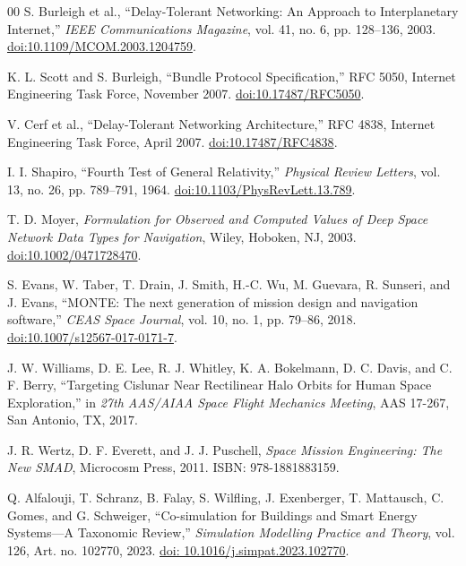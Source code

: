 \documentclass[a4paper,fleqn]{cas-sc}
\begin{document}
\begin{thebibliography}{00}
 S. Burleigh et al., ``Delay-Tolerant Networking: An Approach to Interplanetary Internet,'' \textit{IEEE Communications Magazine}, vol. 41, no. 6, pp. 128--136, 2003. \href{https://doi.org/10.1109/MCOM.2003.1204759}{doi:10.1109/MCOM.2003.1204759}.

 K. L. Scott and S. Burleigh, ``Bundle Protocol Specification,'' RFC 5050, Internet Engineering Task Force, November 2007. \href{https://doi.org/10.17487/RFC5050}{doi:10.17487/RFC5050}.

 V. Cerf et al., ``Delay-Tolerant Networking Architecture,'' RFC 4838, Internet Engineering Task Force, April 2007. \href{https://doi.org/10.17487/RFC4838}{doi:10.17487/RFC4838}.

 I. I. Shapiro, ``Fourth Test of General Relativity,'' \textit{Physical Review Letters}, vol. 13, no. 26, pp. 789--791, 1964. \href{https://doi.org/10.1103/PhysRevLett.13.789}{doi:10.1103/PhysRevLett.13.789}.

 T. D. Moyer, \textit{Formulation for Observed and Computed Values of Deep Space Network Data Types for Navigation}, Wiley, Hoboken, NJ, 2003. \href{https://doi.org/10.1002/0471728470}{doi:10.1002/0471728470}.

 S. Evans, W. Taber, T. Drain, J. Smith, H.-C. Wu, M. Guevara, R. Sunseri, and J. Evans, ``MONTE: The next generation of mission design and navigation software,'' \textit{CEAS Space Journal}, vol. 10, no. 1, pp. 79--86, 2018. \href{https://doi.org/10.1007/s12567-017-0171-7}{doi:10.1007/s12567-017-0171-7}.

 J. W. Williams, D. E. Lee, R. J. Whitley, K. A. Bokelmann, D. C. Davis, and C. F. Berry, ``Targeting Cislunar Near Rectilinear Halo Orbits for Human Space Exploration,'' in \textit{27th AAS/AIAA Space Flight Mechanics Meeting}, AAS 17-267, San Antonio, TX, 2017.

 J. R. Wertz, D. F. Everett, and J. J. Puschell, \textit{Space Mission Engineering: The New SMAD}, Microcosm Press, 2011. ISBN: 978-1881883159.

 Q. Alfalouji, T. Schranz, B. Falay, S. Wilfling, J. Exenberger, T. Mattausch, C. Gomes, and G. Schweiger, ``Co-simulation for Buildings and Smart Energy Systems---A Taxonomic Review,'' \textit{Simulation Modelling Practice and Theory}, vol. 126, Art. no. 102770, 2023. \href{https://doi.org/10.1016/j.simpat.2023.102770}{doi: 10.1016/j.simpat.2023.102770}.


\end{thebibliography}
\end{document}
